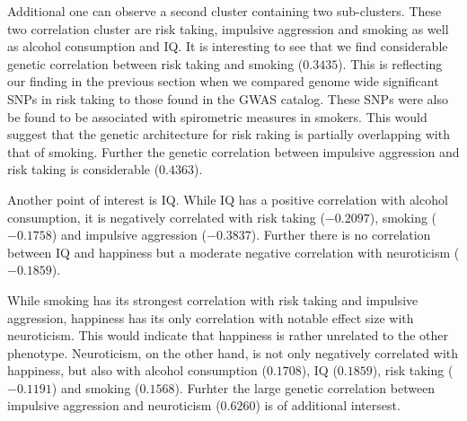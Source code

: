 Additional one can observe a second cluster containing two sub-clusters.
These two correlation cluster are risk taking, impulsive aggression and smoking as well as alcohol consumption and IQ\@.
It is interesting to see that we find considerable genetic correlation between risk taking and smoking ($0.3435$).
This is reflecting our finding in the previous section when we compared genome wide significant SNPs in risk taking to those found in the GWAS catalog.
These SNPs were also be found to be associated with spirometric measures in smokers.
This would suggest that the genetic architecture for risk raking is partially overlapping with that of smoking.
Further the genetic correlation between impulsive aggression and risk taking is considerable ($0.4363$).

Another point of interest is IQ\@.
While IQ has a positive correlation with alcohol consumption, it is negatively correlated with risk taking ($-0.2097$), smoking ($-0.1758$) and impulsive aggression ($-0.3837$).
Further there is no correlation between IQ and happiness but a moderate negative correlation with neuroticism ($-0.1859$).

While smoking has its strongest correlation with risk taking and impulsive aggression, happiness has its only correlation with notable effect size with neuroticism.
This would indicate that happiness is rather unrelated to the other phenotype. 
Neuroticism, on the other hand, is not only negatively correlated with happiness, but also with alcohol consumption ($0.1708$), IQ ($0.1859$), risk taking ($-0.1191$) and smoking ($0.1568$).
Furhter the large genetic correlation between impulsive aggression and neuroticism ($0.6260$) is of additional intersest.
